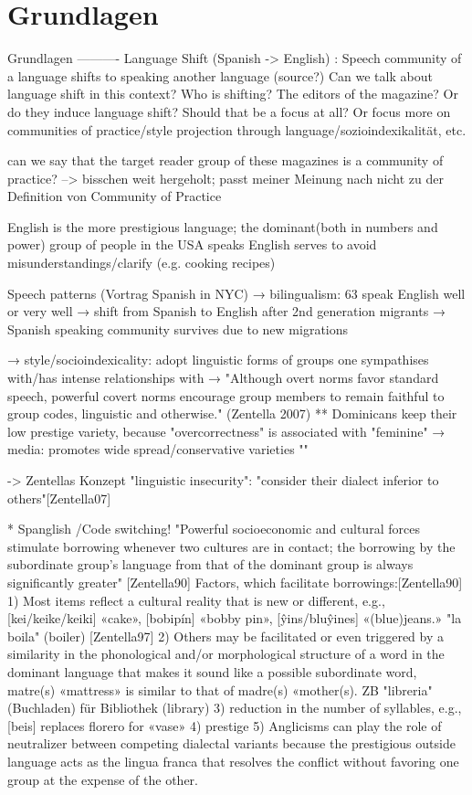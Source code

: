 \section{Grundlagen}

Grundlagen
----------
Language Shift (Spanish -> English) : Speech community of a language shifts to speaking another language (source?)
Can we talk about language shift in this context?
Who is shifting? The editors of the magazine? Or do they induce language shift?
Should that be a focus at all? Or focus more on communities of practice/style projection through language/sozioindexikalität, etc.

can we say that the target reader group of these magazines is a community of practice?
--> bisschen weit hergeholt; passt meiner Meinung nach nicht zu der Definition von Community of Practice

English is the more prestigious language;
the dominant(both in numbers and power) group of people in the USA speaks English
serves to avoid misunderstandings/clarify (e.g. cooking recipes)

Speech patterns (Vortrag Spanish in NYC)
→ bilingualism: 63%
speak English well or very well
→ shift from Spanish to English after 2nd generation migrants
→ Spanish speaking community survives due to new migrations

→ style/socioindexicality: adopt linguistic forms of groups one sympathises with/has intense
relationships with
→ "Although overt norms favor standard speech, powerful covert norms encourage
group members to remain faithful to group codes, linguistic and otherwise." (Zentella 2007)
** Dominicans keep their low prestige variety, because "overcorrectness" is associated with
"feminine"
→ media: promotes wide spread/conservative varieties  ""

-> Zentellas Konzept "linguistic insecurity": "consider their dialect inferior to others"[Zentella07]


* Spanglish /Code switching!
"Powerful socioeconomic and cultural forces stimulate borrowing whenever two cultures are in contact;
the borrowing by the subordinate group's language from that of the dominant group is always
significantly greater" [Zentella90]
Factors, which facilitate borrowings:[Zentella90]
 1) Most items reflect a cultural reality that is new or different, e.g., [kei/keike/keiki]
 «cake», [bobipín] «bobby pin», [ŷins/bluŷines] «(blue)jeans.»
 "la boila" (boiler) [Zentella97]
 2) Others may be facilitated or even triggered by a similarity in the phonological and/or morphological
 structure of a word in the dominant language that makes it sound like a possible subordinate word,
 matre(s) «mattress» is similar to that of madre(s) «mother(s).
 ZB "libreria" (Buchladen) für Bibliothek (library)
 3) reduction in the number of syllables, e.g., [beis] replaces florero for «vase»
 4) prestige
 5) Anglicisms can play the role of neutralizer between competing dialectal variants because the
 prestigious outside language acts as the lingua franca that resolves the conflict without favoring one
 group at the expense of the other.

